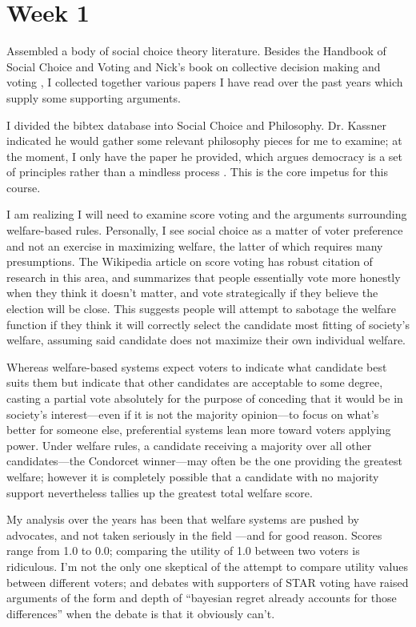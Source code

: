 
\section{Week 1}

Assembled a body of social choice theory literature.  Besides the Handbook of Social Choice and Voting \autocite{Heckelman2015} and Nick's book on collective decision making and voting \autocite{Tideman2006}, I collected together various papers I have read over the past years which supply some supporting arguments.

I divided the bibtex database into Social Choice and Philosophy.  Dr. Kassner indicated he would gather some relevant philosophy pieces for me to examine; at the moment, I only have the paper he provided, which argues democracy is a set of principles rather than a mindless process \autocite{Kassner2006}.  This is the core impetus for this course.

I am realizing I will need to examine score voting and the arguments surrounding welfare-based rules.  Personally, I see social choice as a matter of voter preference and not an exercise in maximizing welfare, the latter of which requires many presumptions.  The Wikipedia article on score voting has robust citation of research in this area, and summarizes that people essentially vote more honestly when they think it doesn't matter, and vote strategically if they believe the election will be close.  This suggests people will attempt to sabotage the welfare function if they think it will correctly select the candidate most fitting of society's welfare, assuming said candidate does not maximize their own individual welfare.

Whereas welfare-based systems expect voters to indicate what candidate best suits them but indicate that other candidates are acceptable to some degree, casting a partial vote absolutely for the purpose of conceding that it would be in society's interest—even if it is not the majority opinion—to  focus on what's better for someone else, preferential systems lean more toward voters applying power.  Under welfare rules, a candidate receiving a majority over all other candidates—the Condorcet winner—may often be the one providing the greatest welfare; however it is completely possible that a candidate with no majority support nevertheless tallies up the greatest total welfare score.

My analysis over the years has been that welfare systems are pushed by advocates, and not taken seriously in the field \autocite{AccDemEfficiency}—and for good reason.  Scores range from 1.0 to 0.0; comparing the utility of 1.0 between two voters is ridiculous.  I'm not the only one skeptical of the attempt to compare utility values between different voters; and debates with supporters of STAR voting have raised arguments of the form and depth of ``bayesian regret already accounts for those differences'' when the debate is that it obviously can't.

